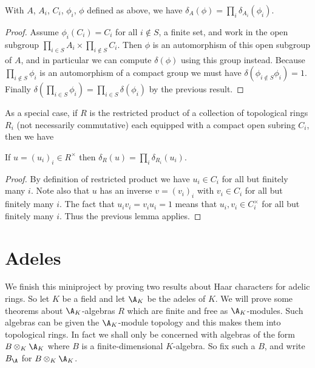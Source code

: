 \begin{lemma}
  \label{addHaarScalarFactor_restricted_product}
  With $A$, $A_i$, $C_i$, $\phi_i$, $\phi$ defined as above, we have
  $\delta_A(\phi)=\prod_i\delta_{A_i}(\phi_i)$.
\end{lemma}
\begin{proof}
  Assume $\phi_i(C_i)=C_i$ for all $i\not\in S$, a finite set, and work in the
  open subgroup $\prod_{i\in S}A_i\times\prod_{i\not\in S}C_i$. Then $\phi$ is an automorphism of
  this open subgroup of $A$, and in particular we can compute $\delta(\phi)$ using
  this group instead. Because $\prod_{i\not\in S}\phi_i$ is an automorphism of a compact
  group we must have $\delta(\phi_{i\not\in S}\phi_i)=1$. Finally
  $\delta(\prod_{i\in S}\phi_i)=\prod_{i\in S}\delta(\phi_i)$ by the previous result.
\end{proof}

As a special case, if $R$ is the restricted product of a collection of topological rings $R_i$
  (not necessarily commutative) each equipped with a compact open subring $C_i$, then
  we have

\begin{corollary}
  \label{distribHaarChar_restricted_product}
  If $u=(u_i)_i\in R^\times$ then $\delta_R(u)=\prod_i\delta_{R_i}(u_i)$.
\end{corollary}
\begin{proof}
  By definition of restricted product we have $u_i\in C_i$ for all but finitely many $i$.
  Note also that $u$ has an inverse $v=(v_i)_i$ with $v_i\in C_i$ for all but finitely many $i$.
  The fact that $u_iv_i=v_iu_i=1$ means that $u_i,v_i\in C_i^\times$ for all but finitely many $i$.
  Thus the previous lemma applies.
\end{proof}

\section{Adeles}

We finish this miniproject by proving two results about Haar characters for
adelic rings. So let $K$ be a field and let $\A_K$ be the adeles of $K$.
We will prove some theorems about $\A_K$-algebras $R$ which are finite
and free as $\A_K$-modules. Such algebras can be given the $\A_K$-module topology
and this makes them into topological rings. In fact we shall only be concerned
with algebras of the form $B\otimes_K\A_K$ where $B$ is a finite-dimensional
$K$-algebra. So fix such a $B$, and write $B_{\A}$ for $B\otimes_K\A_K$.

